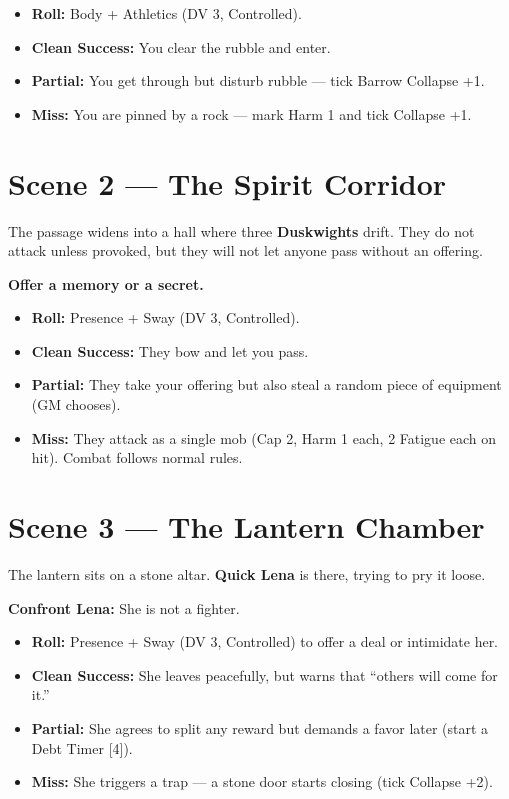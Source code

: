 \documentclass[11pt]{book}
\begin{document}
\begin{itemize}
  \item \textbf{Roll:} Body + Athletics (DV 3, Controlled).
  \item \textbf{Clean Success:} You clear the rubble and enter.
  \item \textbf{Partial:} You get through but disturb rubble --- tick Barrow Collapse +1.
  \item \textbf{Miss:} You are pinned by a rock --- mark Harm 1 and tick Collapse +1.
\end{itemize}

\section{Scene 2 --- The Spirit Corridor}

The passage widens into a hall where three \textbf{Duskwights} drift. They do not attack unless provoked, but they will not let anyone pass without an offering.

\textbf{Offer a memory or a secret.}

\begin{itemize}
  \item \textbf{Roll:} Presence + Sway (DV 3, Controlled).
  \item \textbf{Clean Success:} They bow and let you pass.
  \item \textbf{Partial:} They take your offering but also steal a random piece of equipment (GM chooses).
  \item \textbf{Miss:} They attack as a single mob (Cap 2, Harm 1 each, 2 Fatigue each on hit). Combat follows normal rules.
\end{itemize}

\section{Scene 3 --- The Lantern Chamber}

The lantern sits on a stone altar. \textbf{Quick Lena} is there, trying to pry it loose.

\textbf{Confront Lena:} She is not a fighter.

\begin{itemize}
  \item \textbf{Roll:} Presence + Sway (DV 3, Controlled) to offer a deal or intimidate her.
  \item \textbf{Clean Success:} She leaves peacefully, but warns that ``others will come for it.''
  \item \textbf{Partial:} She agrees to split any reward but demands a favor later (start a Debt Timer [4]).
  \item \textbf{Miss:} She triggers a trap --- a stone door starts closing (tick Collapse +2).
\end{itemize}
\end{document}
